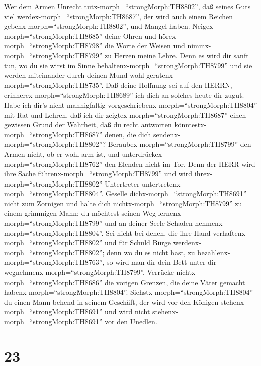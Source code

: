  Wer dem Armen Unrecht tutx-morph=``strongMorph:TH8802'',
daß seines Guts viel werdex-morph=``strongMorph:TH8687'', der wird auch
einem Reichen gebenx-morph=``strongMorph:TH8802'', und Mangel haben.
 Neigex-morph=``strongMorph:TH8685'' deine Ohren und
hörex-morph=``strongMorph:TH8798'' die Worte der Weisen und
nimmx-morph=``strongMorph:TH8799'' zu Herzen meine Lehre. 
Denn es wird dir sanft tun, wo du sie wirst im Sinne
behaltenx-morph=``strongMorph:TH8799'' und sie werden miteinander durch
deinen Mund wohl geratenx-morph=``strongMorph:TH8735''. 
Daß deine Hoffnung sei auf den HERRN,
erinnerex-morph=``strongMorph:TH8689'' ich dich an solches heute dir
zugut.  Habe ich dir's nicht mannigfaltig
vorgeschriebenx-morph=``strongMorph:TH8804'' mit Rat und Lehren,
 daß ich dir zeigtex-morph=``strongMorph:TH8687'' einen
gewissen Grund der Wahrheit, daß du recht antworten
könntestx-morph=``strongMorph:TH8687'' denen, die dich
sendenx-morph=``strongMorph:TH8802''? 
Beraubex-morph=``strongMorph:TH8799'' den Armen nicht, ob er wohl arm
ist, und unterdrückex-morph=``strongMorph:TH8762'' den Elenden nicht im
Tor.  Denn der HERR wird ihre Sache
führenx-morph=``strongMorph:TH8799'' und wird
ihrex-morph=``strongMorph:TH8802'' Untertreter
untertretenx-morph=``strongMorph:TH8804''.  Geselle
dichx-morph=``strongMorph:TH8691'' nicht zum Zornigen und halte dich
nichtx-morph=``strongMorph:TH8799'' zu einem grimmigen Mann;
 du möchtest seinen Weg
lernenx-morph=``strongMorph:TH8799'' und an deiner Seele Schaden
nehmenx-morph=``strongMorph:TH8804''.  Sei nicht bei denen,
die ihre Hand verhaftenx-morph=``strongMorph:TH8802'' und für Schuld
Bürge werdenx-morph=``strongMorph:TH8802'';  denn wo du es
nicht hast, zu bezahlenx-morph=``strongMorph:TH8763'', so wird man dir
dein Bett unter dir wegnehmenx-morph=``strongMorph:TH8799''.
 Verrücke nichtx-morph=``strongMorph:TH8686'' die vorigen
Grenzen, die deine Väter gemacht habenx-morph=``strongMorph:TH8804''.
 Siehstx-morph=``strongMorph:TH8804'' du einen Mann behend
in seinem Geschäft, der wird vor den Königen
stehenx-morph=``strongMorph:TH8691'' und wird nicht
stehenx-morph=``strongMorph:TH8691'' vor den Unedlen.

\hypertarget{section-22}{%
\section{23}\label{section-22}}

